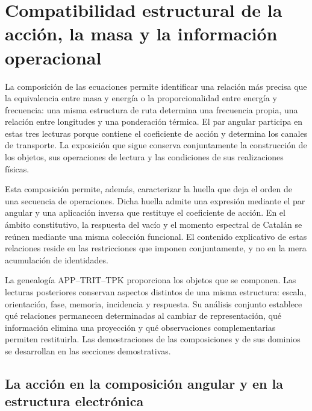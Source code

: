 \section{Compatibilidad estructural de la acción, la masa y la información operacional}
\label{sec:narrativa-estructural}

La composición de las ecuaciones permite identificar una relación más precisa
que la equivalencia entre masa y energía o la proporcionalidad entre energía
y frecuencia: una misma estructura de ruta determina una frecuencia propia,
una relación entre longitudes y una ponderación térmica. El par angular
participa en estas tres lecturas porque contiene el coeficiente de acción y
determina los canales de transporte. La exposición que sigue conserva
conjuntamente la construcción de los objetos, sus operaciones de lectura y
las condiciones de sus realizaciones físicas.

Esta composición permite, además, caracterizar la huella que deja el orden
de una secuencia de operaciones. Dicha huella admite una expresión mediante
el par angular y una aplicación inversa que restituye el coeficiente de
acción. En el ámbito constitutivo, la respuesta del vacío y el momento
espectral de Catalán se reúnen mediante una misma colección funcional. El
contenido explicativo de estas relaciones reside en las restricciones que
imponen conjuntamente, y no en la mera acumulación de identidades.

La genealogía APP--TRIT--TPK proporciona los objetos que se componen. Las
lecturas posteriores conservan aspectos distintos de una misma estructura:
escala, orientación, fase, memoria, incidencia y respuesta. Su análisis
conjunto establece qué relaciones permanecen determinadas al cambiar de
representación, qué información elimina una proyección y qué observaciones
complementarias permiten restituirla. Las demostraciones de las composiciones
y de sus dominios se desarrollan en las secciones demostrativas.

\subsection{La acción en la composición angular y en la estructura electrónica}
\label{subsec:narrativa-accion-angular}

